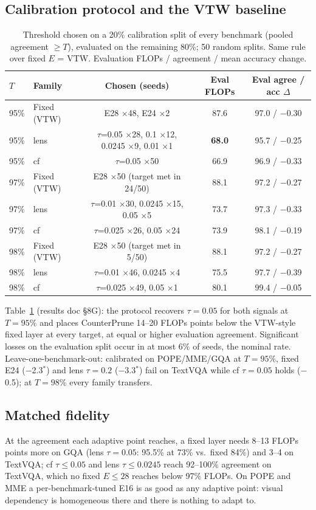\documentclass[10pt]{article}
\newcommand{\method}{CounterPrune}
\newcommand{\sig}{$^{*}$}
\begin{document}
\subsection{Calibration protocol and the VTW baseline}
\begin{table}[t]
\centering\small
\caption{Threshold chosen on a 20\% calibration split of every benchmark (pooled agreement $\ge T$), evaluated on the
remaining 80\%; 50 random splits. Same rule over fixed $E$ = VTW. Evaluation FLOPs / agreement / mean accuracy change.}
\label{tab:calib}
\begin{tabular}{llccc}
\toprule
$T$ & Family & Chosen (seeds) & Eval FLOPs & Eval agree / acc $\Delta$ \\
\midrule
95\% & Fixed (VTW) & E28 $\times$48, E24 $\times$2 & 87.6 & 97.0 / $-$0.30 \\
95\% & lens & $\tau$=0.05 $\times$28, 0.1 $\times$12, 0.0245 $\times$9, 0.01 $\times$1 & \textbf{68.0} & 95.7 / $-$0.25 \\
95\% & cf & $\tau$=0.05 $\times$50 & 66.9 & 96.9 / $-$0.33 \\
97\% & Fixed (VTW) & E28 $\times$50 (target met in 24/50) & 88.1 & 97.2 / $-$0.27 \\
97\% & lens & $\tau$=0.01 $\times$30, 0.0245 $\times$15, 0.05 $\times$5 & 73.7 & 97.3 / $-$0.33 \\
97\% & cf & $\tau$=0.025 $\times$26, 0.05 $\times$24 & 73.9 & 98.1 / $-$0.19 \\
98\% & Fixed (VTW) & E28 $\times$50 (target met in 5/50) & 88.1 & 97.2 / $-$0.27 \\
98\% & lens & $\tau$=0.01 $\times$46, 0.0245 $\times$4 & 75.5 & 97.7 / $-$0.39 \\
98\% & cf & $\tau$=0.025 $\times$49, 0.05 $\times$1 & 80.1 & 99.4 / $-$0.05 \\
\bottomrule
\end{tabular}
\end{table}
Table~\ref{tab:calib} (results doc \S8G): the protocol recovers $\tau=0.05$ for both signals at $T=95\%$ and places
\method{} 14--20 FLOPs points below the VTW-style fixed layer at every target, at equal or higher evaluation agreement.
Significant losses on the evaluation split occur in at most 6\% of seeds, the nominal rate. Leave-one-benchmark-out:
calibrated on POPE/MME/GQA at $T=95\%$, fixed E24 ($-$2.3\sig) and lens $\tau=0.2$ ($-$3.3\sig) fail on TextVQA while
cf $\tau=0.05$ holds ($-$0.5); at $T=98\%$ every family transfers.

\subsection{Matched fidelity}
At the agreement each adaptive point reaches, a fixed layer needs 8--13 FLOPs points more on GQA (lens $\tau=0.05$:
95.5\% at 73\% vs.\ fixed 84\%) and 3--4 on TextVQA; cf $\tau\le0.05$ and lens $\tau\le0.0245$ reach 92--100\%
agreement on TextVQA, which no fixed $E\le28$ reaches below 97\% FLOPs. On POPE and MME a per-benchmark-tuned E16 is as
good as any adaptive point: visual dependency is homogeneous there and there is nothing to adapt to.
\end{document}
